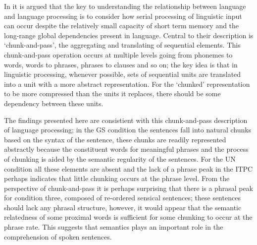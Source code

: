 \documentclass[a4paper,10pt,twoside]{article}
\begin{document}
In \cite{ChristiansenChater2016} it is argued that the key to
understanding the relationship between language and language
processing is to consider how serial processing of linguistic input
can occur despite the relatively small capacity of short term memory
and the long-range global dependencies present in language. Central to
their description is \lq{}chunk-and-pass\rq{}, the aggregating and
translating of sequential elements. This chunk-and-pass operation
occurs at multiple levels going from phonemes to words, words to
phrases, phrases to clauses and so on; the key idea is that in
linguistic processing, whenever possible, sets of sequential units are
translated into a unit with a more abstract representation. For the
\lq{}chunked\rq{} representation to be more compressed than the units
it replaces, there should be some dependency between these
units.

The findings presented here are consistient with this chunk-and-pass
description of language processing; in the GS condition the sentences
fall into natural chunks based on the syntax of the sentence, these
chunks are readily represented abstractly because the constituent
words for meaningful phrases and the process of chunking is aided by
the semantic regularity of the sentences. For the UN condition all these
elements are absent and the lack of a phrase peak in the ITPC perhaps
indicates that little chunking occurs at the phrase level. From the
perspective of chunk-and-pass it is perhaps surprising that there is a
phrasal peak for condition three, composed of re-ordered sensical
sentences; these sentences should lack any phrasal structure, however,
it would appear that the semantic relatedness of some proximal words
is sufficient for some chunking to occur at the phrase rate. This
suggests that semantics plays an important role in the comprehension of
spoken sentences.
\end{document}
